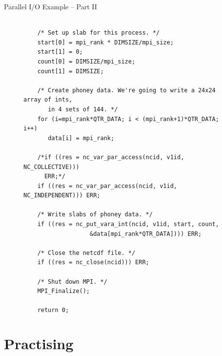 \documentclass[compress,11pt,xcolor=svgnames,aspectratio=169]{beamer}
\begin{document}
\begin{frame}[fragile]{Parallel I/O Example -- Part II}

\begin{figure}
\centering
\begin{varwidth}{\linewidth}
{ \tiny

\begin{verbatim}

    /* Set up slab for this process. */
    start[0] = mpi_rank * DIMSIZE/mpi_size;
    start[1] = 0;
    count[0] = DIMSIZE/mpi_size;
    count[1] = DIMSIZE;

    /* Create phoney data. We're going to write a 24x24 array of ints,
       in 4 sets of 144. */
    for (i=mpi_rank*QTR_DATA; i < (mpi_rank+1)*QTR_DATA; i++)
       data[i] = mpi_rank;

    /*if ((res = nc_var_par_access(ncid, v1id, NC_COLLECTIVE)))
      ERR;*/
    if ((res = nc_var_par_access(ncid, v1id, NC_INDEPENDENT))) ERR;

    /* Write slabs of phoney data. */
    if ((res = nc_put_vara_int(ncid, v1id, start, count,
			       &data[mpi_rank*QTR_DATA]))) ERR;

    /* Close the netcdf file. */
    if ((res = nc_close(ncid)))	ERR;

    /* Shut down MPI. */
    MPI_Finalize();

    return 0;

\end{verbatim}

}
\end{varwidth}
\end{figure}

\end{frame}

\section{Practising}
\end{document}
